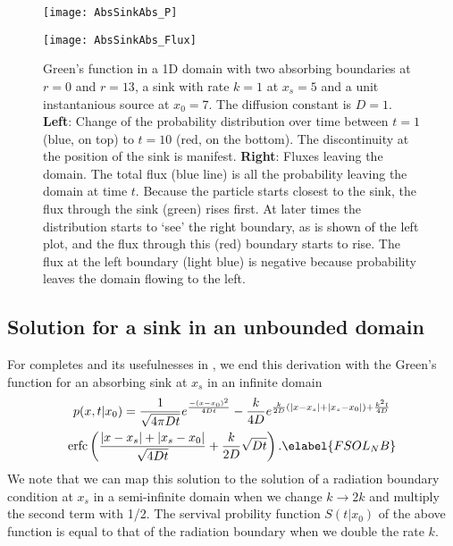 \begin{figure}[ht]
\begin{minipage}[ht]{.5\linewidth}
\centering
\texttt{[image: AbsSinkAbs\_P]}
\end{minipage}
\begin{minipage}[ht]{.5\linewidth}
\centering
\texttt{[image: AbsSinkAbs\_Flux]}
\end{minipage}
\caption{ Green's function in a 1D domain with two absorbing boundaries at $r=0$ and $r=13$, a sink with rate $k=1$ at $x_s=5$ and a unit instantanious source at $x_0=7$. The diffusion constant is $D=1$. {\bf Left}: Change of the probability distribution over time between $t=1$ (blue, on top) to $t=10$ (red, on the bottom). The discontinuity at the position of the sink is manifest. {\bf Right}: Fluxes leaving the domain. The total flux (blue line) is all the probability leaving the domain at time $t$. Because the particle starts closest to the sink, the flux through the sink (green) rises first. At later times the distribution starts to `see' the right boundary, as is shown of the left plot, and the flux through this (red) boundary starts to rise. The flux at the left boundary (light blue) is negative because probability leaves the domain flowing to the left. 
}
\end{figure}

\subsection{Solution for a sink in an unbounded domain}
For completes and its usefulnesses in \GFRD, we end this derivation with the Green's function for an absorbing sink at $x_s$ in an infinite domain
\begin{multline}
 p(x,t|x_0) = \frac{1}{\sqrt{4 \pi D t}}e^{\frac{-(x-x_0)^2}{4 D t}} - \frac{k}{4 D}e^{\frac{k}{2 D}(|x-x_s|+|x_s-x_0|)+\frac{k^2 t}{4 D}} \\
\mathrm{erfc}\left( \frac{|x-x_s|+|x_s-x_0|}{\sqrt{4 D t}}+\frac{k}{2D}\sqrt{D t} \right).
\elabel{FSOL_NB}
\end{multline}
We note that we can map this solution to the solution of a radiation boundary condition at $x_s$ in a semi-infinite domain when we change $k \rightarrow 2 k$ and multiply the second term with 1/2. The servival probility function $S(t|x_0)$ of the above function is equal to that of the radiation boundary when we double the rate $k$.
